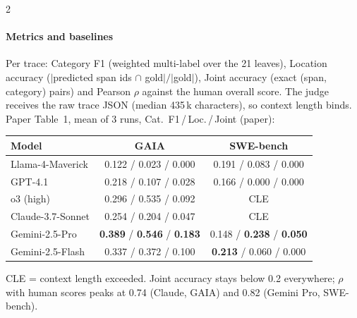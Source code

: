 \begin{multicols}{2}
\paragraph{Metrics and baselines} Per trace: Category F1 (weighted multi-label over the 21 leaves), Location accuracy ($|$predicted span ids $\cap$ gold$|/|$gold$|$), Joint accuracy (exact (span, category) pairs) and Pearson $\rho$ against the human overall score. The judge receives the raw trace JSON (median 435\,k characters), so context length binds. Paper Table~1, mean of 3 runs, Cat.\ F1\,/\,Loc.\,/\,Joint (paper):

\begin{center}\small
\begin{tabular}{@{}lcc@{}}\toprule
Model & GAIA & SWE-bench\\\midrule
Llama-4-Maverick & 0.122 / 0.023 / 0.000 & 0.191 / 0.083 / 0.000\\
GPT-4.1 & 0.218 / 0.107 / 0.028 & 0.166 / 0.000 / 0.000\\
o3 (high) & 0.296 / 0.535 / 0.092 & CLE\\
Claude-3.7-Sonnet & 0.254 / 0.204 / 0.047 & CLE\\
Gemini-2.5-Pro & \textbf{0.389} / \textbf{0.546} / \textbf{0.183} & 0.148 / \textbf{0.238} / \textbf{0.050}\\
Gemini-2.5-Flash & 0.337 / 0.372 / 0.100 & \textbf{0.213} / 0.060 / 0.000\\\bottomrule
\end{tabular}
\end{center}
CLE = context length exceeded. Joint accuracy stays below 0.2 everywhere; $\rho$ with human scores peaks at 0.74 (Claude, GAIA) and 0.82 (Gemini Pro, SWE-bench).


\end{multicols}

